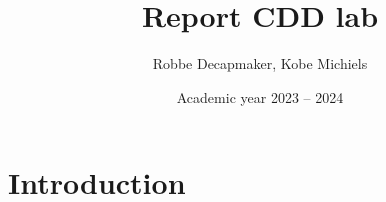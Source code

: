 \documentclass[a4paper,kul]{kulakarticle} %
\date{Academic year 2023 -- 2024}
\title{Report CDD lab}
\author{Robbe Decapmaker, Kobe Michiels}
\begin{document}
\maketitle
\section{Introduction}
\end{document}
